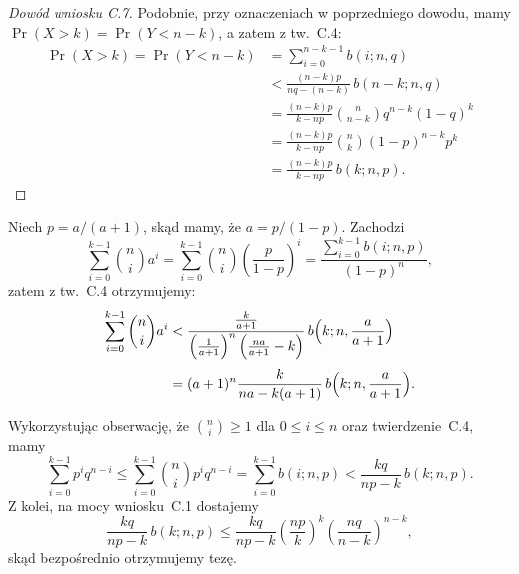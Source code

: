 \begin{proof}[Dowód wniosku C.7]
	Podobnie, przy oznaczeniach w poprzedniego dowodu, mamy $\Pr(X>k)=\Pr(Y<n-k)$, a zatem z tw.~C.4:
	\begin{align*}
		\Pr(X>k) = \Pr(Y<n-k) &= \sum_{i=0}^{n-k-1}b(i;n,q) \\
		&< \frac{(n-k)p}{nq-(n-k)}\,b(n-k;n,q) \\[1mm]
		&= \frac{(n-k)p}{k-np}\binom{n}{n-k}q^{n-k}(1-q)^k \\[1mm]
		&= \frac{(n-k)p}{k-np}\binom{n}{k}(1-p)^{n-k}p^k \\[1mm]
		&= \frac{(n-k)p}{k-np}\,b(k;n,p).
	\end{align*}
\end{proof}

\exercise{} %
Niech $p=a/(a+1)$, skąd mamy, że $a=p/(1-p)$. Zachodzi
\[
	\sum_{i=0}^{k-1}\binom{n}{i}a^i = \sum_{i=0}^{k-1}\binom{n}{i}\left(\frac{p}{1-p}\right)^i = \frac{\sum_{i=0}^{k-1}b(i;n,p)}{(1-p)^n},
\]
zatem z tw.~C.4 otrzymujemy:
\begin{align*}
	\sum_{i=0}^{k-1}\binom{n}{i}a^i &< \frac{\frac{k}{a+1}}{\left(\frac{1}{a+1}\right)^n\left(\frac{na}{a+1}-k\right)}\,b\Bigl(k;n,\frac{a}{a+1}\Bigr) \\[1mm]
	&= (a+1)^n\frac{k}{na-k(a+1)}\,b\Bigl(k;n,\frac{a}{a+1}\Bigr).
\end{align*}

\exercise{} %
Wykorzystując obserwację, że $\binom{n}{i}\ge1$ dla $0\le i\le n$ oraz twierdzenie~C.4, mamy
\[
	\sum_{i=0}^{k-1}p^iq^{n-i} \le \sum_{i=0}^{k-1}\binom{n}{i}p^iq^{n-i} = \sum_{i=0}^{k-1}b(i;n,p) < \frac{kq}{np-k}\,b(k;n,p).
\]
Z kolei, na mocy wniosku~C.1 dostajemy
\[
	\frac{kq}{np-k}\,b(k;n,p) \le \frac{kq}{np-k}\left(\frac{np}{k}\right)^k\left(\frac{nq}{n-k}\right)^{n-k},
\]
skąd bezpośrednio otrzymujemy tezę.

